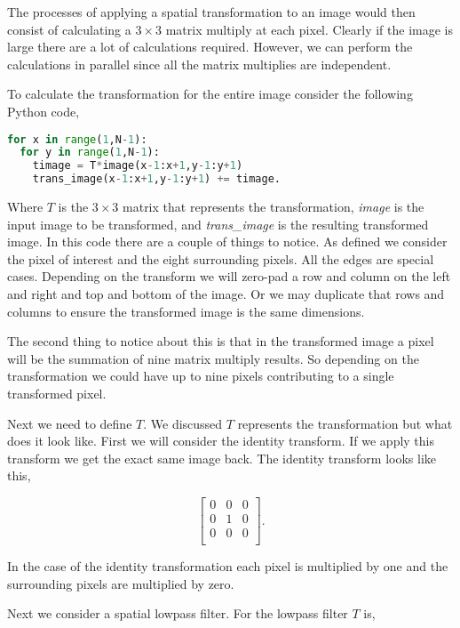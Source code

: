 The processes of applying a spatial transformation to an image would then consist of calculating a $3 \times 3$ matrix multiply at each pixel. Clearly if the image is large there are a lot of calculations required. However, we can perform the calculations in parallel since all the matrix multiplies are independent.

To calculate the transformation for the entire image consider the following Python code,

\begin{lstlisting}[language=Python]
for x in range(1,N-1):
  for y in range(1,N-1):
	timage = T*image(x-1:x+1,y-1:y+1)
	trans_image(x-1:x+1,y-1:y+1) += timage.
\end{lstlisting}

Where $T$ is the $3\times 3$ matrix that represents the transformation, \emph{image} is the input image to be transformed, and \emph{trans\_image} is the resulting transformed image. In this code there are a couple of things to notice. As defined we consider the pixel of interest and the eight surrounding pixels. All the edges are special cases. Depending on the transform we will zero-pad a row and column on the left and right and top and bottom of the image. Or we may duplicate that rows and columns to ensure the transformed image is the same dimensions. 
 
The second thing to notice about this is that in the transformed image a pixel will be the summation of nine matrix multiply results. So depending on the transformation we could have up to nine pixels contributing to a single transformed pixel. 

Next we need to define $T$. We discussed $T$ represents the transformation but what does it look like. First we will consider the identity transform. If we apply this transform we get the exact same image back. The identity transform looks like this,

\begin{equation}
\begin{bmatrix}
0 & 0 & 0\\
0 & 1 & 0\\
0 & 0 & 0\\
\end{bmatrix}.
\end{equation}
	
In the case of the identity transformation each pixel is multiplied by one and the surrounding pixels are multiplied by zero.

Next we consider a spatial lowpass filter. For the lowpass filter $T$ is,

